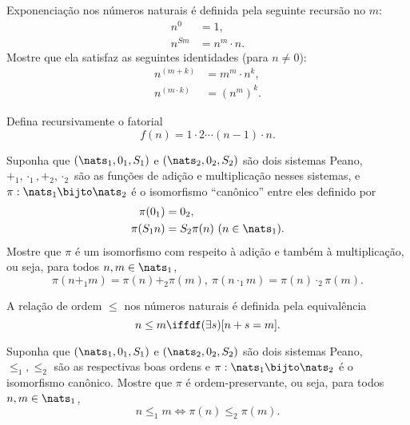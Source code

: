 \begin{exercise}
	Exponenciação nos números naturais é definida pela seguinte recursão no $m$:
	$$
		\begin{aligned}
			n^0 &= 1,\\
			n^{Sm} &= n^m \cdot n.
		\end{aligned}
	$$
	Mostre que ela satisfaz as seguintes identidades (para $n \neq 0$):
	$$
		\begin{aligned}
			n^{(m + k)} &= m^m \cdot n^k,\\
			n^{(m \cdot k)} &= (n^{m})^k.
		\end{aligned}
	$$
\end{exercise}

\begin{exercise}
	Defina recursivamente o fatorial
	$$
		f(n) = 1 \cdot 2 \cdots (n -1) \cdot n.
	$$
\end{exercise}

\begin{exercise}
	Suponha que $(\nats_1, 0_1, S_1)$ e $(\nats_2, 0_2, S_2)$ são dois sistemas Peano, $+_1, \cdot_1, +_2, \cdot_2$ são as funções de adição e multiplicação nesses sistemas, e $\pi : \nats_1 \bijto \nats_2$ é o isomorfismo ``canônico'' entre eles definido por
	$$
		\begin{aligned}
			\pi(0_1) &= 0_2,\\
			\pi(S_1n) &= S_2\pi(n) \ (n \in \nats_1).
		\end{aligned}
	$$
	Mostre que $\pi$ é um isomorfismo com respeito à adição e também à multiplicação, ou seja, para todos $n, m \in \nats_1$,
	$$
		\pi(n +_1 m) = \pi(n) +_2 \pi(m),\ \pi(n \cdot_1 m) = \pi(n) \cdot_2 \pi(m).
	$$
\end{exercise}

\begin{definition}
	A relação de ordem $\leq$ nos números naturais é definida pela equivalência
	$$
		n \leq m \iffdf (\exists s)[n + s = m].
	$$
\end{definition}

\begin{exercise}
	Suponha que $(\nats_1, 0_1, S_1)$ e $(\nats_2, 0_2, S_2)$ são dois sistemas Peano, $\leq_1, \leq_2$ são as respectivas boas ordens e $\pi : \nats_1 \bijto \nats_2$ é o isomorfismo canônico. Mostre que $\pi$ é ordem-preservante, ou seja, para todos $n, m \in \nats_1$,
	$$
		n \leq_1 m \iff \pi(n) \leq_2 \pi(m).
	$$
\end{exercise}
